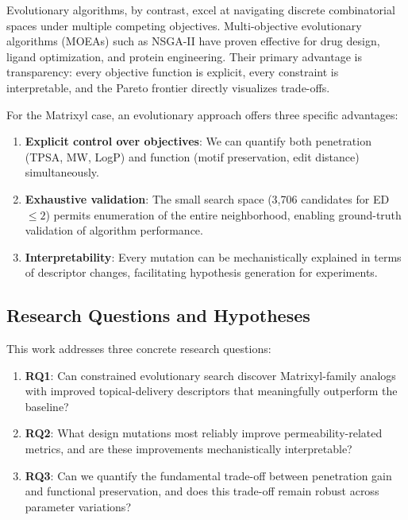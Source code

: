 \documentclass[11pt,a4paper]{article}
\begin{document}
Evolutionary algorithms, by contrast, excel at navigating discrete combinatorial spaces under multiple competing objectives. Multi-objective evolutionary algorithms (MOEAs) such as NSGA-II\cite{nsga2} have proven effective for drug design\cite{drug_design_ga2022}, ligand optimization\cite{ligand_opt2021}, and protein engineering\cite{protein_ga2023}. Their primary advantage is transparency: every objective function is explicit, every constraint is interpretable, and the Pareto frontier directly visualizes trade-offs.

For the Matrixyl case, an evolutionary approach offers three specific advantages:
\begin{enumerate}
  \item \textbf{Explicit control over objectives}: We can quantify both penetration (TPSA, MW, LogP) and function (motif preservation, edit distance) simultaneously.
  \item \textbf{Exhaustive validation}: The small search space (3,706 candidates for ED $\leq 2$) permits enumeration of the entire neighborhood, enabling ground-truth validation of algorithm performance.
  \item \textbf{Interpretability}: Every mutation can be mechanistically explained in terms of descriptor changes, facilitating hypothesis generation for experiments.
\end{enumerate}

\subsection{Research Questions and Hypotheses}

This work addresses three concrete research questions:

\begin{enumerate}
  \item \textbf{RQ1}: Can constrained evolutionary search discover Matrixyl-family analogs with improved topical-delivery descriptors that meaningfully outperform the baseline?
  \item \textbf{RQ2}: What design mutations most reliably improve permeability-related metrics, and are these improvements mechanistically interpretable?
  \item \textbf{RQ3}: Can we quantify the fundamental trade-off between penetration gain and functional preservation, and does this trade-off remain robust across parameter variations?
\end{enumerate}
\end{document}
